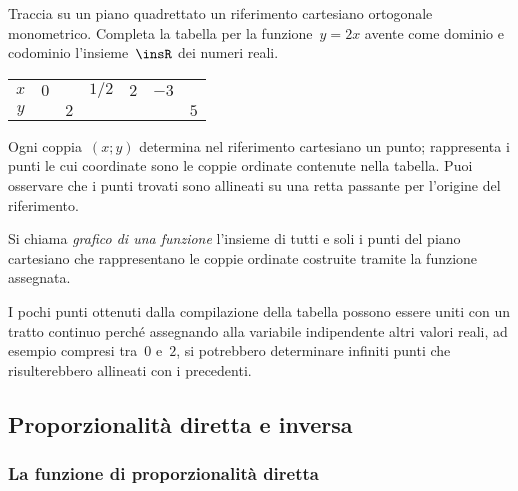 \begin{exrig}
 \begin{esempio}
Traccia su un piano quadrettato un riferimento cartesiano ortogonale 
monometrico.
Completa la tabella per la funzione~$y=2x$ avente come dominio e codominio 
l'insieme~$\insR$ dei numeri reali.
\begin{center}
 \begin{tabular}{ccccccc}
 \toprule
 $x$ & $0$ && $1/2$ & $2$ & $-3$ &\\
 $y$ &&$2$&&&&$5$\\
 \bottomrule
 \end{tabular}
\end{center}
Ogni coppia~$(x;y)$ determina nel riferimento cartesiano un punto; rappresenta i 
punti le cui coordinate sono
le coppie ordinate contenute nella tabella. Puoi osservare che i punti trovati 
sono allineati su una retta passante
per l'origine del riferimento.
 \end{esempio}
\end{exrig}
\begin{definizione}
 Si chiama \emph{grafico di una funzione} l'insieme di tutti e soli i punti del 
piano cartesiano che
 rappresentano le coppie ordinate costruite tramite la funzione assegnata.
\end{definizione}
\osservazione
I pochi punti ottenuti dalla compilazione della tabella possono essere uniti con 
un tratto continuo perché
assegnando alla variabile indipendente altri valori reali, ad esempio compresi 
tra~$0$ e~$2$, si potrebbero
determinare infiniti punti che risulterebbero allineati con i precedenti.


\subsection{Proporzionalità diretta e inversa}
\label{subsec:fun_proporzionalita}

\subsubsection{La funzione di proporzionalità diretta}

